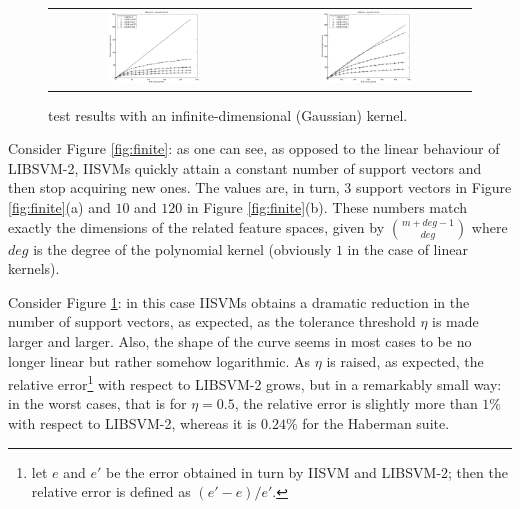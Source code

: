 \documentclass[10pt,twocolumn,letterpaper]{article}
\begin{document}
\begin{figure}[!htbp]
  \begin{center}
    \begin{tabular}{cc}
       \includegraphics[width=0.45\textwidth]{Haberman_gaussian} &
       \includegraphics[width=0.45\textwidth]{Diabetes_gaussian}
    \end{tabular}
  \end{center}
  \caption{\label{fig:infinite} test results with an infinite-dimensional
  (Gaussian) kernel.}
\end{figure}

Consider Figure \ref{fig:finite}: as one can see, as opposed to the
linear behaviour of LIBSVM-2, IISVMs quickly attain a constant number
of support vectors and then stop acquiring new ones. The values are,
in turn, $3$ support vectors in Figure \ref{fig:finite}(a) and $10$
and $120$ in Figure \ref{fig:finite}(b). These numbers match exactly
the dimensions of the related feature spaces, given by
$\binom{m+deg-1}{deg}$ where $deg$ is the degree of the polynomial
kernel (obviously $1$ in the case of linear kernels).

Consider Figure \ref{fig:infinite}: in this case IISVMs obtains a
dramatic reduction in the number of support vectors, as expected, as
the tolerance threshold $\eta$ is made larger and larger. Also, the
shape of the curve seems in most cases to be no longer linear but
rather somehow logarithmic. As $\eta$ is raised, as expected, the
relative error\footnote{let $e$ and $e'$ be the error obtained
in turn by IISVM and LIBSVM-2; then the relative error is defined as
$(e'-e)/e'$.} with respect to LIBSVM-2 grows, but
in a remarkably small way: in the worst cases, that is for $\eta=0.5$,
the relative error is slightly more than $1\%$ with respect to
LIBSVM-2, whereas it is $0.24\%$ for the Haberman suite.
\end{document}
